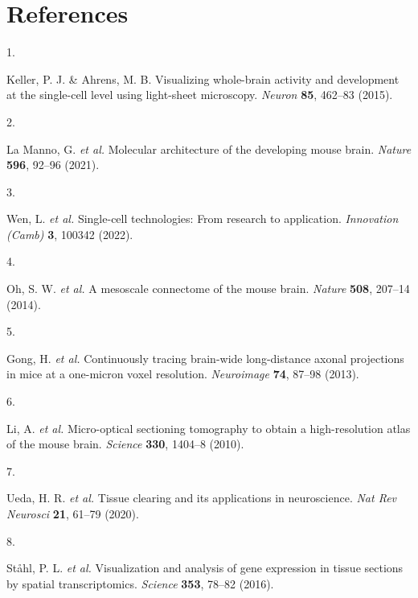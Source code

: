 \documentclass[
  12pt,
]{article}
\newlength{\cslhangindent}
\newlength{\csllabelwidth}
\newenvironment{CSLReferences}[2] %
 {%
  \setlength{\parindent}{0pt}
  \ifodd #1 \everypar{\setlength{\hangindent}{\cslhangindent}}\ignorespaces\fi
  \ifnum #2 > 0
  \setlength{\parskip}{#2\baselineskip}
  \fi
 }%
 {}
\newcommand{\CSLLeftMargin}[1]{\parbox[t]{\csllabelwidth}{#1}}
\newcommand{\CSLRightInline}[1]{\parbox[t]{\linewidth - \csllabelwidth}{#1}\break}
\begin{document}
\clearpage

\hypertarget{references}{%
\section*{References}\label{references}}

\hypertarget{refs}{}
\begin{CSLReferences}{0}{0}
\leavevmode{}%
\CSLLeftMargin{1. }
\CSLRightInline{Keller, P. J. \& Ahrens, M. B. Visualizing whole-brain
activity and development at the single-cell level using light-sheet
microscopy. \emph{Neuron} \textbf{85}, 462--83 (2015).}

\leavevmode{}%
\CSLLeftMargin{2. }
\CSLRightInline{La Manno, G. \emph{et al.} Molecular architecture of the
developing mouse brain. \emph{Nature} \textbf{596}, 92--96 (2021).}

\leavevmode{}%
\CSLLeftMargin{3. }
\CSLRightInline{Wen, L. \emph{et al.} Single-cell technologies: From
research to application. \emph{Innovation (Camb)} \textbf{3}, 100342
(2022).}

\leavevmode{}%
\CSLLeftMargin{4. }
\CSLRightInline{Oh, S. W. \emph{et al.} A mesoscale connectome of the
mouse brain. \emph{Nature} \textbf{508}, 207--14 (2014).}

\leavevmode{}%
\CSLLeftMargin{5. }
\CSLRightInline{Gong, H. \emph{et al.} Continuously tracing brain-wide
long-distance axonal projections in mice at a one-micron voxel
resolution. \emph{Neuroimage} \textbf{74}, 87--98 (2013).}

\leavevmode{}%
\CSLLeftMargin{6. }
\CSLRightInline{Li, A. \emph{et al.} Micro-optical sectioning tomography
to obtain a high-resolution atlas of the mouse brain. \emph{Science}
\textbf{330}, 1404--8 (2010).}

\leavevmode{}%
\CSLLeftMargin{7. }
\CSLRightInline{Ueda, H. R. \emph{et al.} Tissue clearing and its
applications in neuroscience. \emph{Nat Rev Neurosci} \textbf{21},
61--79 (2020).}

\leavevmode{}%
\CSLLeftMargin{8. }
\CSLRightInline{Ståhl, P. L. \emph{et al.} Visualization and analysis of
gene expression in tissue sections by spatial transcriptomics.
\emph{Science} \textbf{353}, 78--82 (2016).}


\end{CSLReferences}
\end{document}
